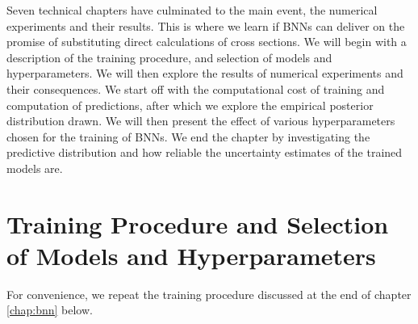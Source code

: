 Seven technical chapters have culminated to the main event, the numerical experiments and their results. This is where we learn if BNNs can deliver on the promise of substituting direct calculations of cross sections. We will begin with a description of the training procedure, and selection of models and hyperparameters. We will then explore the results of numerical experiments and their consequences. We start off with the computational cost of training and computation of predictions, after which we explore the empirical posterior distribution drawn. We will then present the effect of various hyperparameters chosen for the training of BNNs. We end the chapter by investigating the predictive distribution and how reliable the uncertainty estimates of the trained models are.


\section{Training Procedure and Selection of Models and Hyperparameters}
For convenience, we repeat the training procedure discussed at the end of chapter \ref{chap:bnn} below.
